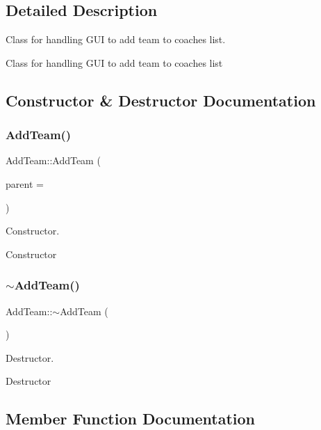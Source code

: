 \subsection{Detailed Description}
Class for handling G\+UI to add team to coaches list. 

Class for handling G\+UI to add team to coaches list 

\subsection{Constructor \& Destructor Documentation}
\mbox{\label{classAddTeam_a0bbfb0f776a510c1e0ae8c6969f47a33}} 
\subsubsection{\texorpdfstring{AddTeam()}{AddTeam()}}
{\footnotesize\ttfamily Add\+Team\+::\+Add\+Team (\begin{DoxyParamCaption}\item[{Q\+Widget $\ast$}]{parent = {} }\end{DoxyParamCaption})\hspace{0.3cm}{\ttfamily [explicit]}}



Constructor. 

Constructor \mbox{\label{classAddTeam_a8e492e3b6d3a7ab160c76cdf81448627}} 
\subsubsection{\texorpdfstring{$\sim$AddTeam()}{~AddTeam()}}
{\footnotesize\ttfamily Add\+Team\+::$\sim$\+Add\+Team (\begin{DoxyParamCaption}{ }\end{DoxyParamCaption})}



Destructor. 

Destructor 

\subsection{Member Function Documentation}
\mbox{\label{classAddTeam_a1ce8fbae7abacd854edcd4ef46bc541a}} 
